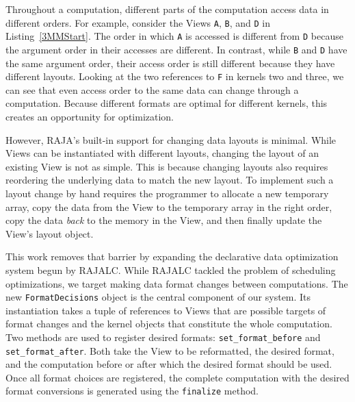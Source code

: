 \documentclass[sigconf,review=true]{acmart}
\begin{document}
Throughout a computation, different parts of the computation access data in different orders.
For example, consider the Views \verb.A., \verb.B., and \verb.D. in Listing~\ref{3MMStart}. 
The order in which \verb.A. is accessed is different from \verb.D. because the argument order in their accesses are different.
In contrast, while \verb.B. and \verb.D. have the same argument order, their access order is still different because they have different layouts.
Looking at the two references to \verb.F. in kernels two and three, we can see that even access order to the same data can change through a computation.
Because different formats are optimal for different kernels, this creates an opportunity for optimization. 

However, RAJA's built-in support for changing data layouts is minimal. 
While Views can be instantiated with different layouts, changing the layout of an existing View is not as simple.
This is because changing layouts also requires reordering the underlying data to match the new layout. 
To implement such a layout change by hand requires the programmer to allocate a new temporary array, 
copy the data from the View to the temporary array in the right order, 
copy the data \textit{back} to the memory in the View, 
and then finally update the View's layout object.

This work removes that barrier by expanding the declarative data optimization system begun by RAJALC.
While RAJALC tackled the problem of scheduling optimizations, we target making data format changes between computations. 
The new \verb.FormatDecisions. object is the central component of our system. 
Its instantiation takes a tuple of references to Views that are possible targets of format changes and the kernel objects that constitute the whole computation.
Two methods are used to register desired formats: \verb.set_format_before. and \verb.set_format_after..
Both take the View to be reformatted, the desired format, and the computation before or after which the desired format should be used.
Once all format choices are registered, the complete computation with the desired format conversions is generated using the \verb.finalize. method.
\end{document}
